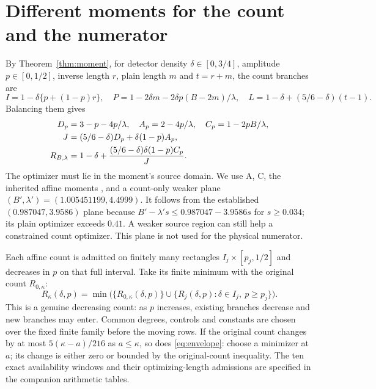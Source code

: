 \documentclass[10pt,a4paper]{article}
\newcommand{\kap}{\kappa}
\begin{document}
\section{Different moments for the count and the numerator}
By Theorem~\ref{thm:moment}, for detector density
$\delta\in[0,3/4]$, amplitude $p\in[0,1/2]$, inverse length $r$,
plain length $m$ and $t=r+m$, the count branches are
\[
 I=1-\delta\{p+(1-p)r\},\quad
 P=1-2\delta m-2\delta p(B-2m)/\lambda,\quad
 L=1-\delta+(5/6-\delta)(t-1).
\]
Balancing them gives
\begin{align}\label{eq:count}
 D_p&=3-p-4p/\lambda,\quad A_p=2-4p/\lambda,
 \quad C_p=1-2pB/\lambda,\notag\\
 J&=(5/6-\delta)D_p+\delta(1-p)A_p,\notag\\
 R_{B,\lambda}&=1-\delta+
       \frac{(5/6-\delta)\delta(1-p)C_p}{J}.
\end{align}
The optimizer must lie in the moment's source domain. We use A, C,
the inherited affine moments \cite{previous,incumbent}, and a count-only
weaker plane $(B',\lambda')=(1.005451199,4.4999)$. It follows from the
established $(0.987047,3.9586)$ plane because
$B'-\lambda's\le0.987047-3.9586s$ for $s\ge0.034$; its plain optimizer
exceeds $0.41$. A weaker source region can still help a constrained
count optimizer. This plane is not used for the physical numerator.

Each affine count is admitted on finitely many rectangles
$I_j\times[p_j,1/2]$ and decreases in $p$ on that full interval.
Take its finite minimum with the original count $R_{0,\kap}$:
\begin{equation}\label{eq:envelope}
 R_\kap(\delta,p)=\min\bigl(\{R_{0,\kap}(\delta,p)\}
       \cup\{R_j(\delta,p):\delta\in I_j,\ p\ge p_j\}\bigr).
\end{equation}
This is a genuine decreasing count: as $p$ increases, existing branches
decrease and new branches may enter. Common degrees, controls and
constants are chosen over the fixed finite family before the moving rows.
If the original count changes by at most $5(\kap-a)/216$ as
$a\le\kap$, so does \eqref{eq:envelope}: choose a minimizer at $a$;
its change is either zero or bounded by the original-count inequality.
The ten exact availability windows and their optimizing-length admissions
are specified in the companion arithmetic tables.
\end{document}
